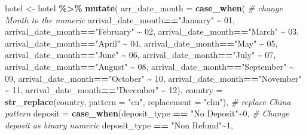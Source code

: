 \documentclass[11pt,a4paper,]{article}
\newenvironment{Shaded}{\begin{snugshade}}{\end{snugshade}}
\newcommand{\CommentTok}[1]{\textcolor[rgb]{0.56,0.35,0.01}{\textit{#1}}}
\newcommand{\DataTypeTok}[1]{\textcolor[rgb]{0.13,0.29,0.53}{#1}}
\newcommand{\DecValTok}[1]{\textcolor[rgb]{0.00,0.00,0.81}{#1}}
\newcommand{\KeywordTok}[1]{\textcolor[rgb]{0.13,0.29,0.53}{\textbf{#1}}}
\newcommand{\NormalTok}[1]{#1}
\newcommand{\OperatorTok}[1]{\textcolor[rgb]{0.81,0.36,0.00}{\textbf{#1}}}
\newcommand{\StringTok}[1]{\textcolor[rgb]{0.31,0.60,0.02}{#1}}
\begin{document}
\begin{Shaded}
\begin{Highlighting}[]
\NormalTok{hotel \textless{}{-}}\StringTok{ }\NormalTok{hotel }\OperatorTok{\%\textgreater{}\%}\StringTok{ }\KeywordTok{mutate}\NormalTok{(}
    \DataTypeTok{arr\_date\_month =} \KeywordTok{case\_when}\NormalTok{(   }\CommentTok{\# change Month to the numeric }
\NormalTok{    arrival\_date\_month}\OperatorTok{==}\StringTok{"January"} \OperatorTok{\textasciitilde{}}\StringTok{ }\DecValTok{01}\NormalTok{,}
\NormalTok{    arrival\_date\_month}\OperatorTok{==}\StringTok{"February"} \OperatorTok{\textasciitilde{}}\StringTok{ }\DecValTok{02}\NormalTok{,}
\NormalTok{    arrival\_date\_month}\OperatorTok{==}\StringTok{"March"} \OperatorTok{\textasciitilde{}}\StringTok{ }\DecValTok{03}\NormalTok{,}
\NormalTok{    arrival\_date\_month}\OperatorTok{==}\StringTok{"April"} \OperatorTok{\textasciitilde{}}\StringTok{ }\DecValTok{04}\NormalTok{,}
\NormalTok{    arrival\_date\_month}\OperatorTok{==}\StringTok{"May"} \OperatorTok{\textasciitilde{}}\StringTok{ }\DecValTok{05}\NormalTok{,}
\NormalTok{    arrival\_date\_month}\OperatorTok{==}\StringTok{"June"} \OperatorTok{\textasciitilde{}}\StringTok{ }\DecValTok{06}\NormalTok{,}
\NormalTok{    arrival\_date\_month}\OperatorTok{==}\StringTok{"July"} \OperatorTok{\textasciitilde{}}\StringTok{ }\DecValTok{07}\NormalTok{,}
\NormalTok{    arrival\_date\_month}\OperatorTok{==}\StringTok{"August"} \OperatorTok{\textasciitilde{}}\StringTok{ }\DecValTok{08}\NormalTok{,}
\NormalTok{    arrival\_date\_month}\OperatorTok{==}\StringTok{"September"} \OperatorTok{\textasciitilde{}}\StringTok{ }\DecValTok{09}\NormalTok{,}
\NormalTok{    arrival\_date\_month}\OperatorTok{==}\StringTok{"October"} \OperatorTok{\textasciitilde{}}\StringTok{ }\DecValTok{10}\NormalTok{,}
\NormalTok{    arrival\_date\_month}\OperatorTok{==}\StringTok{"November"} \OperatorTok{\textasciitilde{}}\StringTok{ }\DecValTok{11}\NormalTok{,}
\NormalTok{    arrival\_date\_month}\OperatorTok{==}\StringTok{"December"} \OperatorTok{\textasciitilde{}}\StringTok{ }\DecValTok{12}\NormalTok{),}
    \DataTypeTok{country =} \KeywordTok{str\_replace}\NormalTok{(country, }\DataTypeTok{pattern =} \StringTok{"cn"}\NormalTok{, }\DataTypeTok{replacement =} \StringTok{"chn"}\NormalTok{), }\CommentTok{\# replace China pattern}
    \DataTypeTok{deposit =} \KeywordTok{case\_when}\NormalTok{(deposit\_type }\OperatorTok{==}\StringTok{ "No Deposit"}\OperatorTok{\textasciitilde{}}\DecValTok{0}\NormalTok{,            }\CommentTok{\# Change deposit as binary numeric}
\NormalTok{                        deposit\_type }\OperatorTok{==}\StringTok{ "Non Refund"}\OperatorTok{\textasciitilde{}}\DecValTok{1}\NormalTok{,}

\end{Highlighting}
\end{Shaded}
\end{document}
